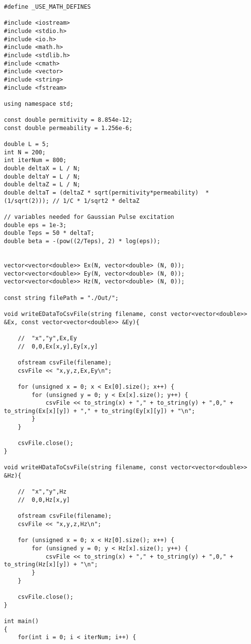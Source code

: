 \begin{verbatim}
#define _USE_MATH_DEFINES

#include <iostream>
#include <stdio.h>
#include <io.h>
#include <math.h>
#include <stdlib.h>
#include <cmath>
#include <vector>
#include <string>
#include <fstream>

using namespace std;

const double permitivity = 8.854e-12;
const double permeability = 1.256e-6;

double L = 5;
int N = 200;
int iterNum = 800;
double deltaX = L / N;
double deltaY = L / N;
double deltaZ = L / N;
double deltaT = (deltaZ * sqrt(permitivity*permeability)  * (1/sqrt(2))); // 1/C * 1/sqrt2 * deltaZ

// variables needed for Gaussian Pulse excitation
double eps = 1e-3;
double Teps = 50 * deltaT;
double beta = -(pow((2/Teps), 2) * log(eps));


vector<vector<double>> Ex(N, vector<double> (N, 0));
vector<vector<double>> Ey(N, vector<double> (N, 0));
vector<vector<double>> Hz(N, vector<double> (N, 0));

const string filePath = "./Out/";

void writeEDataToCsvFile(string filename, const vector<vector<double>> &Ex, const vector<vector<double>> &Ey){
	
	//	"x","y",Ex,Ey
	//	0,0,Ex[x,y],Ey[x,y]
	
	ofstream csvFile(filename);
	csvFile << "x,y,z,Ex,Ey\n";
	
	for (unsigned x = 0; x < Ex[0].size(); x++) {
		for (unsigned y = 0; y < Ex[x].size(); y++) {
			csvFile << to_string(x) + "," + to_string(y) + ",0," + to_string(Ex[x][y]) + "," + to_string(Ey[x][y]) + "\n";
		}
	}
	
	csvFile.close();
}

void writeHDataToCsvFile(string filename, const vector<vector<double>> &Hz){
	
	//	"x","y",Hz
	//	0,0,Hz[x,y]
	
	ofstream csvFile(filename);
	csvFile << "x,y,z,Hz\n";
	
	for (unsigned x = 0; x < Hz[0].size(); x++) {
		for (unsigned y = 0; y < Hz[x].size(); y++) {
			csvFile << to_string(x) + "," + to_string(y) + ",0," + to_string(Hz[x][y]) + "\n";
		}
	}
	
	csvFile.close();
}

int main()
{
	for(int i = 0; i < iterNum; i++) {
		

\end{verbatim}
